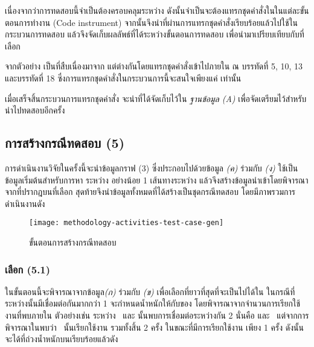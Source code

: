เนื่องจากว่าการทดสอบนี้จำเป็นต้องครอบคลุม{\Path}ระหว่าง{\CUT} ดังนั้นจำเป็นจะต้องแทรกชุดคำสั่งใน{\sourcecode}ในแต่ละขั้นตอนการทำงาน 
(Code instrument) จากนั้นจึงนำ{\sourcecode}ที่ผ่านการแทรกชุดคำสั่งเรียบร้อยแล้วไปใช้ในกระบวนการทดสอบ 
แล้วจึงจัดเก็บผลลัพธ์ที่ได้ระหว่างขั้นตอนการทดสอบ เพื่อนำมาเปรียบเทียบกับ{\TestPath}ที่เลือก

\begin{figure}[hbt!]
    \lstset{basicstyle=\small,style=thesiscodestyle}
    
    \caption{{\class} }
    \label{fig:javaBonusScoreInstrumented}
\end{figure}

จากตัวอย่าง เป็น{\sourcecode}ที่สืบเนื่องมาจาก
แต่ต่างกันโดยแทรกชุดคำสั่งเข้าไปภายใน{\sourcecode} ณ บรรทัดที่ 5, 10, 13 และบรรทัดที่ 18 ซึ่งการแทรกชุดคำสั่งในกระบวนการนี้จะสนใจเพียงแค่{\CUT} เท่านั้น

เมื่อเสร็จสิ้นกระบวนการแทรกชุดคำสั่ง จะนำ{\sourcecode}ที่ได้จัดเก็บไว้ใน {\it ฐานข้อมูล (A)} เพื่อจัดเตรียมไว้สำหรับนำไปทดสอบอีกครั้ง

\clearpage
\subsection{การสร้างกรณีทดสอบ (5)}

การดำเนินงานวิจัยในครั้งนี้จะนำข้อมูลกราฟ (3) ซึ่งประกอบไปด้วยข้อมูล {\it {\scg} (ค)} ร่วมกับ{\it {\cfg} (ง)} ใช้เป็นข้อมูลเริ่มต้นสำหรับการหา{\TestPath}
ระหว่าง{\CUT} อย่างน้อย 1 เส้นทางระหว่าง{\class} แล้วจึงสร้างข้อมูลนำเข้าโดยพิจารณาจาก{\PredicateNode}ที่ปรากฎบน{\TestPath}ที่เลือก 
สุดท้ายจึงนำข้อมูลทั้งหมดที่ได้สร้างเป็นชุดกรณีทดสอบ โดยมีภาพรวมการดำเนินงานดัง {}

\begin{figure}[ht!]
    \centering
    \texttt{[image: methodology-activities-test-case-gen]}
    \caption{ขั้นตอนการสร้างกรณีทดสอบ}
    \label{fig:testcaseGenerationActivity}
\end{figure}

\subsubsection{เลือก{\TestPath} (5.1)}

ในขั้นตอนนี้จะพิจารณาจากข้อมูล{\it \scg (ก)} ร่วมกับ {\it \cfg (ข)} เพื่อเลือก{\TestPath}ที่ยาวที่สุดที่จะเป็นไปได้ใน{\scg} 
ในกรณีที่ระหว่าง{\CUT}นั้นมี{\Path}เชื่อมต่อกันมากกว่า 1 {\Path} จะกำหนดน้ำหนักให้กับ{\Edge}ของ{\scg} โดยพิจารณาจากจำนวนการเรียกใช้งานที่พบภายใน{\cfg} 
ตัวอย่างเช่น ระหว่าง\class\  และ นั้นพบการเชื่อมต่อระหว่างกัน 2 {\method} นั่นคือ
 และ\  แต่จากการพิจารณาใน{\sourcecode}พบว่า{\class}\  นั้นเรียกใช้งาน\method
{} รวมทั้งสิ้น 2 ครั้ง ในขณะที่มีการเรียกใช้งาน  เพียง 1 ครั้ง ดังนั้นจะได้{\scg}ที่ถ่วงน้ำหนักบน{\Edge}เรียบร้อยแล้วดัง 

